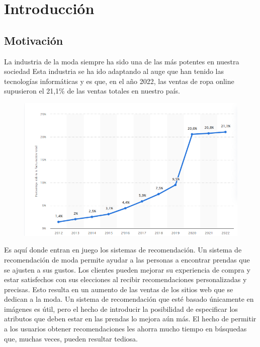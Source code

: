 \documentclass[12pt]{report} %
\begin{document}
\newpage %
\thispagestyle{empty}
\mbox{}


\clearpage
{} %

\chapter{Introducción}

	\section{Motivación}
	La industria de la moda siempre ha sido una de las más potentes en nuestra sociedad
	Esta industria se ha ido adaptando al auge que han tenido las tecnologías informáticas
	y es que, en el año 2022, las ventas de ropa online supusieron el 21,1\% de las ventas
	totales en nuestro país. 
	\begin{figure}[H]
		{\includegraphics[scale=0.6]{venta-online-moda.png}}
	\end{figure}
	Es aquí donde entran en juego los sistemas de recomendación.
	Un sistema de recomendación de moda permite ayudar a las personas a encontrar prendas
	que se ajusten a sus gustos. 
	Los clientes pueden mejorar su experiencia de compra y estar satisfechos con sus elecciones 
	al recibir recomendaciones personalizadas y precisas. Esto resulta en un aumento
	de las ventas de los sitios web que se dedican a la moda.
	Un sistema de recomendación que esté basado únicamente en imágenes es útil, pero el hecho de
	introducir la posibilidad de especificar los atributos que deben estar en las prendas lo mejora
	aún más. El hecho de permitir a los usuarios obtener recomendaciones les ahorra mucho tiempo en búsquedas
	que, muchas veces, pueden resultar tediosa.
\end{document}
